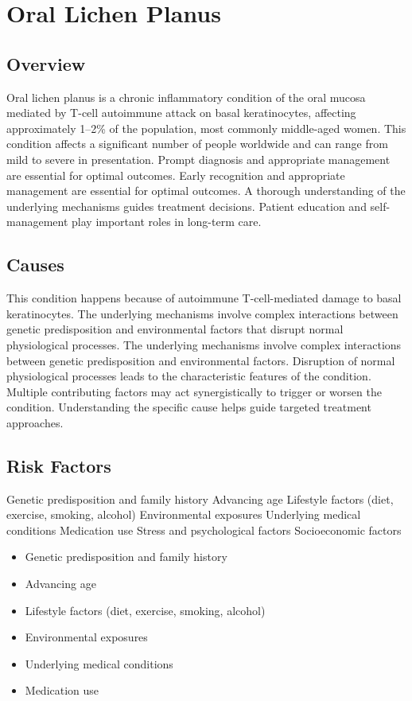 \chapter{Oral Lichen Planus}
\label{sec:Oral Lichen Planus}

\section{Overview}
Oral lichen planus is a chronic inflammatory condition of the oral mucosa mediated by T-cell autoimmune attack on basal keratinocytes, affecting approximately 1--2\% of the population, most commonly middle-aged women. This condition affects a significant number of people worldwide and can range from mild to severe in presentation. Prompt diagnosis and appropriate management are essential for optimal outcomes. Early recognition and appropriate management are essential for optimal outcomes. A thorough understanding of the underlying mechanisms guides treatment decisions. Patient education and self-management play important roles in long-term care.
\section{Causes}
This condition happens because of autoimmune T-cell-mediated damage to basal keratinocytes. The underlying mechanisms involve complex interactions between genetic predisposition and environmental factors that disrupt normal physiological processes. The underlying mechanisms involve complex interactions between genetic predisposition and environmental factors. Disruption of normal physiological processes leads to the characteristic features of the condition. Multiple contributing factors may act synergistically to trigger or worsen the condition. Understanding the specific cause helps guide targeted treatment approaches.
\section{Risk Factors}
Genetic predisposition and family history Advancing age Lifestyle factors (diet, exercise, smoking, alcohol) Environmental exposures Underlying medical conditions Medication use Stress and psychological factors Socioeconomic factors

\begin{itemize}[noitemsep]
  \item Genetic predisposition and family history
  \item Advancing age
  \item Lifestyle factors (diet, exercise, smoking, alcohol)
  \item Environmental exposures
  \item Underlying medical conditions
  \item Medication use
\end{itemize}
